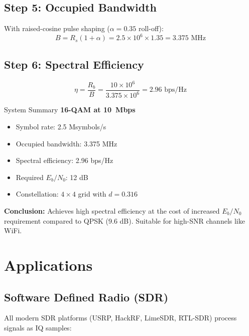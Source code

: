 \subsection*{Step 5: Occupied Bandwidth}

With raised-cosine pulse shaping ($\alpha = 0.35$ roll-off):
\begin{equation}
B = R_s(1 + \alpha) = 2.5 \times 10^6 \times 1.35 = 3.375 \text{ MHz}
\end{equation}

\subsection*{Step 6: Spectral Efficiency}

\begin{equation}
\eta = \frac{R_b}{B} = \frac{10 \times 10^6}{3.375 \times 10^6} = 2.96 \text{ bps/Hz}
\end{equation}

\begin{calloutbox}[colback=black!8!white,colframe=black]{System Summary}
\textbf{16-QAM at 10~Mbps}

\begin{itemize}
\item Symbol rate: 2.5 Msymbols/s
\item Occupied bandwidth: 3.375 MHz
\item Spectral efficiency: 2.96 bps/Hz
\item Required $E_b/N_0$: 12 dB
\item Constellation: $4 \times 4$ grid with $d = 0.316$
\end{itemize}

\textbf{Conclusion:} Achieves high spectral efficiency at the cost of increased $E_b/N_0$ requirement compared to QPSK (9.6 dB). Suitable for high-SNR channels like WiFi.
\end{calloutbox}

\section{Applications}

\subsection{Software Defined Radio (SDR)}

All modern SDR platforms (USRP, HackRF, LimeSDR, RTL-SDR) process signals as IQ samples:

